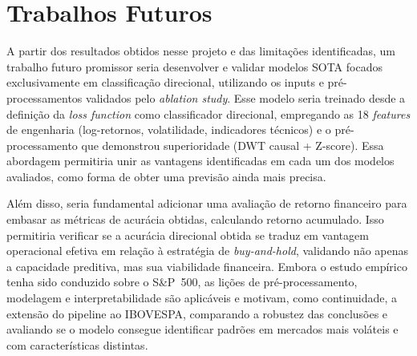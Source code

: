 \section{Trabalhos Futuros}

A partir dos resultados obtidos nesse projeto e das limitações identificadas, um trabalho futuro promissor seria desenvolver e validar modelos SOTA focados exclusivamente em classificação direcional, utilizando os inputs e pré-processamentos validados pelo \textit{ablation study}. Esse modelo seria treinado desde a definição da \textit{loss function} como classificador direcional, empregando as 18 \textit{features} de engenharia (log-retornos, volatilidade, indicadores técnicos) e o pré-processamento que demonstrou superioridade (DWT causal + Z-score). Essa abordagem permitiria unir as vantagens identificadas em cada um dos modelos avaliados, como forma de obter uma previsão ainda mais precisa.

Além disso, seria fundamental adicionar uma avaliação de retorno financeiro para embasar as métricas de acurácia obtidas, calculando retorno acumulado. Isso permitiria verificar se a acurácia direcional obtida se traduz em vantagem operacional efetiva em relação à estratégia de \textit{buy-and-hold}, validando não apenas a capacidade preditiva, mas sua viabilidade financeira. Embora o estudo empírico tenha sido conduzido sobre o S\&P~500, as lições de pré-processamento, modelagem e interpretabilidade são aplicáveis e motivam, como continuidade, a extensão do pipeline ao IBOVESPA, comparando a robustez das conclusões e avaliando se o modelo consegue identificar padrões em mercados mais voláteis e com características distintas.
